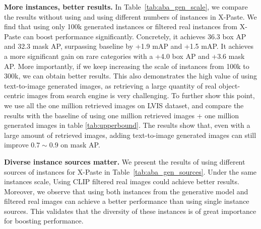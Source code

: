 \documentclass{article}
\begin{document}
\noindent \textbf{More instances, better results.} In Table~\ref{tab:aba_gen_scale}, we compare the results without using and using different numbers of instances in X-Paste. We find that using only 100k generated instances or filtered real instances from X-Paste can boost performance significantly. Concretely, it achieves 36.3 box AP and 32.3 mask AP, surpassing baseline by +1.9 mAP and +1.5 mAP. It achieves a more significant gain on rare categories with a +4.0 box AP and +3.6 mask AP. More importantly, if we keep increasing the scale of instances from 100k to 300k, we can obtain better results. This also demonstrates the high value of using text-to-image generated images, as retrieving a large quantity of real object-centric images from search engine is very challenging. To further show this point, we use all the one million retrieved images on LVIS dataset, and compare the results with the baseline of using one million retrieved images + one million generated images in table \ref{tab:upperbound}. The results show that, even with a large amount of retrieved images, adding text-to-image generated images can still improve $0.7\sim0.9$ on mask AP.
\begin{table}[h]
  \small
  \centering
\caption{Comparison with directly use generated images as training data.}
\label{tab:upperbound}
\end{table}

\noindent \textbf{Diverse instance sources matter.} We present the results of using different sources of instances for X-Paste in Table~\ref{tab:aba_gen_sources}. Under the same instances scale, Using CLIP filtered real images could achieve better results. Moreover, we observe that using both instances from the generative model and filtered real images can achieve a better performance than using single instance sources. This validates that the diversity of these instances is of great importance for boosting performance.
\end{document}
